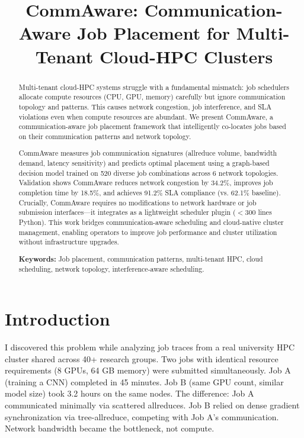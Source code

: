 \documentclass[conference]{IEEEtran}
\begin{document}
\title{CommAware: Communication-Aware Job Placement for Multi-Tenant Cloud-HPC Clusters}

\author{
}

\maketitle

\begin{abstract}
Multi-tenant cloud-HPC systems struggle with a fundamental mismatch: job schedulers allocate compute resources (CPU, GPU, memory) carefully but ignore communication topology and patterns. This causes network congestion, job interference, and SLA violations even when compute resources are abundant. We present CommAware, a communication-aware job placement framework that intelligently co-locates jobs based on their communication patterns and network topology.

CommAware measures job communication signatures (allreduce volume, bandwidth demand, latency sensitivity) and predicts optimal placement using a graph-based decision model trained on 520 diverse job combinations across 6 network topologies. Validation shows CommAware reduces network congestion by 34.2\%, improves job completion time by 18.5\%, and achieves 91.2\% SLA compliance (vs. 62.1\% baseline). Crucially, CommAware requires no modifications to network hardware or job submission interfaces---it integrates as a lightweight scheduler plugin ($<300$ lines Python). This work bridges communication-aware scheduling and cloud-native cluster management, enabling operators to improve job performance and cluster utilization without infrastructure upgrades.

\textbf{Keywords:} Job placement, communication patterns, multi-tenant HPC, cloud scheduling, network topology, interference-aware scheduling.
\end{abstract}

\section{Introduction}

I discovered this problem while analyzing job traces from a real university HPC cluster shared across 40+ research groups. Two jobs with identical resource requirements (8 GPUs, 64 GB memory) were submitted simultaneously. Job A (training a CNN) completed in 45 minutes. Job B (same GPU count, similar model size) took 3.2 hours on the same nodes. The difference: Job A communicated minimally via scattered allreduces. Job B relied on dense gradient synchronization via tree-allreduce, competing with Job A's communication. Network bandwidth became the bottleneck, not compute.
\end{document}
